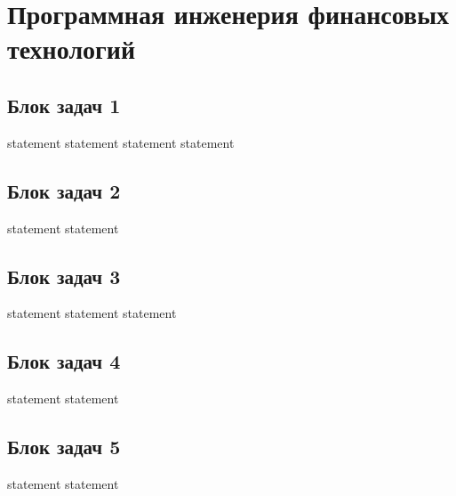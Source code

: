 \chapter{Программная инженерия финансовых технологий}

\section{Блок задач 1}

{statement}
{statement}
{statement}
{statement}

\section{Блок задач 2}

{statement}
{statement}

\section{Блок задач 3}

{statement}
{statement}
{statement}

\section{Блок задач 4}

{statement}
{statement}

\section{Блок задач 5}

{statement}
{statement}
